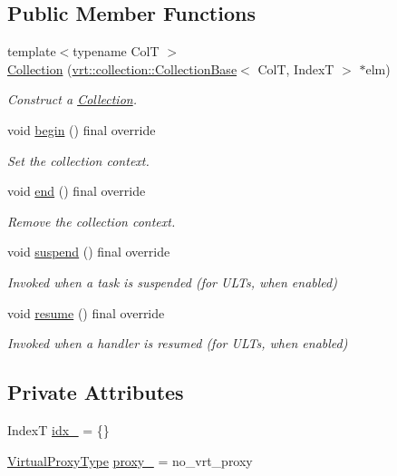 \subsection*{Public Member Functions}
\begin{DoxyCompactItemize}
\item 
{\footnotesize template$<$typename ColT $>$ }\\\hyperlink{structvt_1_1ctx_1_1_collection_a9ff87a5b62bc5cc55eab88eefbeedc53}{Collection} (\hyperlink{structvt_1_1vrt_1_1collection_1_1_collection_base}{vrt\+::collection\+::\+Collection\+Base}$<$ ColT, IndexT $>$ $\ast$elm)
\begin{DoxyCompactList}\small\item\em Construct a {\ttfamily \hyperlink{structvt_1_1ctx_1_1_collection}{Collection}}. \end{DoxyCompactList}\item 
void \hyperlink{structvt_1_1ctx_1_1_collection_a1555355c83dd6f692c03c66882b74846}{begin} () final override
\begin{DoxyCompactList}\small\item\em Set the collection context. \end{DoxyCompactList}\item 
void \hyperlink{structvt_1_1ctx_1_1_collection_afbbbbaa3a85469b7ddded1ded70bd83d}{end} () final override
\begin{DoxyCompactList}\small\item\em Remove the collection context. \end{DoxyCompactList}\item 
void \hyperlink{structvt_1_1ctx_1_1_collection_a8355e824435241b61bb9774b4546c0de}{suspend} () final override
\begin{DoxyCompactList}\small\item\em Invoked when a task is suspended (for U\+L\+Ts, when enabled) \end{DoxyCompactList}\item 
void \hyperlink{structvt_1_1ctx_1_1_collection_a4cf87cf7d38bd8d4706ffda41e31c9c6}{resume} () final override
\begin{DoxyCompactList}\small\item\em Invoked when a handler is resumed (for U\+L\+Ts, when enabled) \end{DoxyCompactList}\end{DoxyCompactItemize}
\subsection*{Private Attributes}
\begin{DoxyCompactItemize}
\item 
IndexT \hyperlink{structvt_1_1ctx_1_1_collection_ac4de6446eac1e860f9c141bb22aff818}{idx\+\_\+} = \{\}
\item 
\hyperlink{namespacevt_a1b417dd5d684f045bb58a0ede70045ac}{Virtual\+Proxy\+Type} \hyperlink{structvt_1_1ctx_1_1_collection_ad0a95fbcccdbcd0a525e809c81b6f148}{proxy\+\_\+} = no\+\_\+vrt\+\_\+proxy
\end{DoxyCompactItemize}


